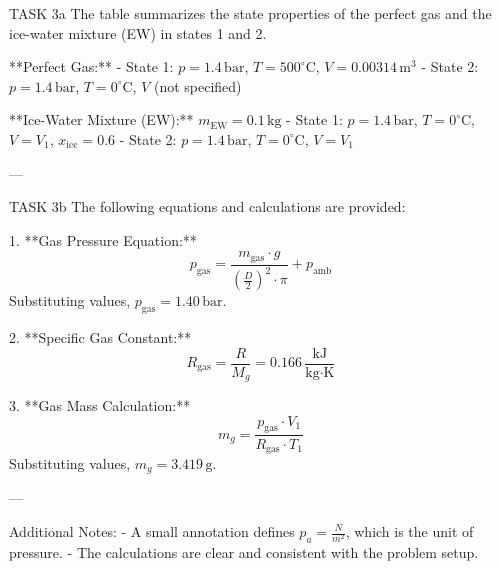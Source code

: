 TASK 3a  
The table summarizes the state properties of the perfect gas and the ice-water mixture (EW) in states 1 and 2.

**Perfect Gas:**
- State 1:  
  \( p = 1.4 \, \text{bar} \), \( T = 500^\circ\text{C} \), \( V = 0.00314 \, \text{m}^3 \)  
- State 2:  
  \( p = 1.4 \, \text{bar} \), \( T = 0^\circ\text{C} \), \( V \) (not specified)

**Ice-Water Mixture (EW):**  
\( m_{\text{EW}} = 0.1 \, \text{kg} \)  
- State 1:  
  \( p = 1.4 \, \text{bar} \), \( T = 0^\circ\text{C} \), \( V = V_1 \), \( x_{\text{ice}} = 0.6 \)  
- State 2:  
  \( p = 1.4 \, \text{bar} \), \( T = 0^\circ\text{C} \), \( V = V_1 \)

---

TASK 3b  
The following equations and calculations are provided:

1. **Gas Pressure Equation:**  
   \[
   p_{\text{gas}} = \frac{m_{\text{gas}} \cdot g}{\left(\frac{D}{2}\right)^2 \cdot \pi} + p_{\text{amb}}
   \]  
   Substituting values, \( p_{\text{gas}} = 1.40 \, \text{bar} \).

2. **Specific Gas Constant:**  
   \[
   R_{\text{gas}} = \frac{R}{M_g} = 0.166 \, \frac{\text{kJ}}{\text{kg·K}}
   \]

3. **Gas Mass Calculation:**  
   \[
   m_g = \frac{p_{\text{gas}} \cdot V_1}{R_{\text{gas}} \cdot T_1}
   \]  
   Substituting values, \( m_g = 3.419 \, \text{g} \).

---

Additional Notes:  
- A small annotation defines \( p_a = \frac{N}{m^2} \), which is the unit of pressure.  
- The calculations are clear and consistent with the problem setup.